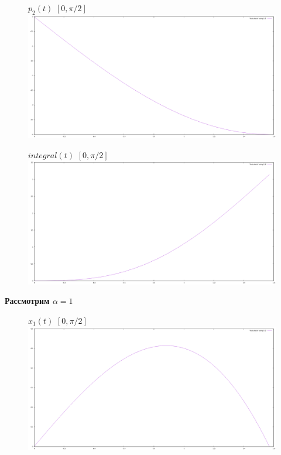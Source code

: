 \documentclass[titlepage]{article}
\begin{document}
\begin{figure}[h!]
$p_2(t)$ $[0, \pi/2]$\\
\centering
\includegraphics[width=1\linewidth]{p_2(t).png} 
\end{figure}
\begin{figure}[h!]
$integral(t)$ $[0, \pi/2]$ \\
\centering
\includegraphics[width=1\linewidth]{integral(t).png} 
\end{figure}
\newpage
\textbf{Рассмотрим $\alpha = 1$}
\begin{figure}[h!]
$x_1(t)$  $[0, \pi/2]$\\
\centering
\includegraphics[width=1\linewidth]{x_11(t).png} 
\end{figure}
\end{document}
